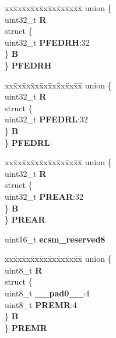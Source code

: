 \begin{DoxyCompactItemize}
\begin{tabbing}
\end{tabbing}\item 
\mbox{\label{structECSM__tag_a4f4e19c493833868efb15c65ff29de0b}} 
\begin{tabbing}
xx\=xx\=xx\=xx\=xx\=xx\=xx\=xx\=xx\=\kill
union \{\\
\>uint32\_t {\bfseries R}\\
\>struct \{\\
\>\>uint32\_t {\bfseries PFEDRH}:32\\
\>\} {\bfseries B}\\
\} {\bfseries PFEDRH}\\

\end{tabbing}\item 
\mbox{\label{structECSM__tag_a71cf884d31fe43a8de3e3f2279bd372e}} 
\begin{tabbing}
xx\=xx\=xx\=xx\=xx\=xx\=xx\=xx\=xx\=\kill
union \{\\
\>uint32\_t {\bfseries R}\\
\>struct \{\\
\>\>uint32\_t {\bfseries PFEDRL}:32\\
\>\} {\bfseries B}\\
\} {\bfseries PFEDRL}\\

\end{tabbing}\item 
\mbox{\label{structECSM__tag_a011ad6116c3a21cb6a3374e6d32d7b17}} 
\begin{tabbing}
xx\=xx\=xx\=xx\=xx\=xx\=xx\=xx\=xx\=\kill
union \{\\
\>uint32\_t {\bfseries R}\\
\>struct \{\\
\>\>uint32\_t {\bfseries PREAR}:32\\
\>\} {\bfseries B}\\
\} {\bfseries PREAR}\\

\end{tabbing}\item 
\mbox{\label{structECSM__tag_a1b3b3b0cc727ee1712cb50246822222d}} 
uint16\+\_\+t {\bfseries ecsm\+\_\+reserved8}
\item 
\mbox{\label{structECSM__tag_a56c4f2ce908bfe9e1588b33d894e0fd4}} 
\begin{tabbing}
xx\=xx\=xx\=xx\=xx\=xx\=xx\=xx\=xx\=\kill
union \{\\
\>uint8\_t {\bfseries R}\\
\>struct \{\\
\>\>uint8\_t {\bfseries \_\_pad0\_\_}:4\\
\>\>uint8\_t {\bfseries PREMR}:4\\
\>\} {\bfseries B}\\
\} {\bfseries PREMR}\\


\end{tabbing}
\end{DoxyCompactItemize}
